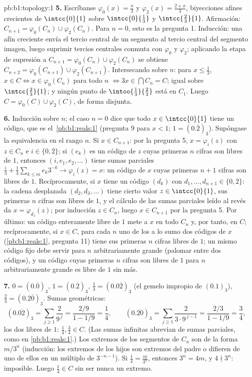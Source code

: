 \begin{solution}{pb:b1:topology:1}
\textbf{5.} Escríbanse $\varphi_0(x) = \frac x3$ y
$\varphi_2(x) = \frac{2 + x}{3}$, biyecciones afines crecientes de
$\intcc{0}{1}$ sobre $\intcc{0}{\frac13}$ y $\intcc{\frac23}{1}$.
Afirmación: $C_{n+1} = \varphi_0(C_n) \cup \varphi_2(C_n)$. Para
$n = 0$, esto es la pregunta 1. Inducción: una  afín
creciente envía el tercio central de un segmento al tercio central
del segmento imagen, luego suprimir tercios centrales conmuta con
$\varphi_0$ y $\varphi_2$; aplicando la etapa de supresión a
$C_{n+1} = \varphi_0(C_n) \cup \varphi_2(C_n)$ se obtiene
$C_{n+2} = \varphi_0(C_{n+1}) \cup \varphi_2(C_{n+1})$. Intersecando
sobre $n$: para $x \leq \frac13$, $x \in C \iff x \in \varphi_0(C_n)$
para todo $n$ $\iff 3x \in \bigcap C_n = C$; igual sobre
$\intcc{\frac23}{1}$; y ningún punto de $\intoo{\frac13}{\frac23}$
está en $C_1$. Luego $C = \varphi_0(C) \cup \varphi_2(C)$, de forma
disjunta.

\textbf{6.} Inducción sobre $n$; el caso $n = 0$ dice que todo
$x \in \intcc{0}{1}$ tiene un código, que es el~\cref{pb:b1:reals:1}
(pregunta 9 para $x < 1$; $1 = (0.\overline 2)_3$). Supóngase la
equivalencia en el rango $n$. Si $x \in C_{n+1}$: por la pregunta 5,
$x = \varphi_i(z)$ con $z \in C_n$ e $i \in \{0, 2\}$; si $(e_k)$ es
un código de $z$ cuyas primeras $n$ cifras son libres de $1$,
entonces $(i, e_1, e_2, \dots)$ tiene sumas parciales
$\frac i3 + \frac13\sum_{k\leq m} e_k 3^{-k} \to \varphi_i(z) = x$:
un código de $x$ cuyas primeras $n + 1$ cifras son libres de $1$.
Recíprocamente, si $x$ tiene un código $(d_k)$ con
$d_1, \dots, d_{n+1} \in \{0, 2\}$: la cadena desplazada
$(d_2, d_3, \dots)$ tiene cierto valor $z \in \intcc{0}{1}$, sus
primeras $n$ cifras son libres de $1$, y el cálculo de las sumas
parciales leído al revés da $x = \varphi_{d_1}(z)$; por inducción
$z \in C_n$, luego $x \in C_{n+1}$ por la pregunta 5. Por último: un
código enteramente libre de $1$ mete a $x$ en todo $C_n$ y, por
tanto, en $C$; recíprocamente, si $x \in C$, para cada $n$ uno de los
a lo sumo dos códigos de $x$ (\cref{pb:b1:reals:1}, pregunta 11)
tiene sus primeras $n$ cifras libres de $1$; un mismo código fijo
debe servir para $n$ arbitrariamente grande (palomar entre dos
códigos), y un código cuyas primeras $n$ cifras son libres de $1$
para $n$ arbitrariamente grande es libre de $1$ sin más.

\textbf{7.} $0 = (0.\overline 0)_3$, $1 = (0.\overline 2)_3$,
$\frac13 = (0.0\overline{2})_3$ (el gemelo impropio de $(0.1)_3$),
$\frac23 = (0.2\overline{0})_3$. Sumas geométricas:
\[
(0.\overline{02})_3 = \sum_{j\geq1} \frac{2}{9^{\,j}}
= \frac{2/9}{1 - 1/9} = \frac14 ,
\qquad
(0.\overline{20})_3 = \sum_{j\geq1} \frac{2}{3\cdot 9^{\,j-1}}
= \frac{2/3}{1 - 1/9} = \frac34 ,
\]
los dos libres de $1$: $\frac14, \frac34 \in C$. (Las sumas infinitas
abrevian  de sumas parciales, como en \cref{pb:b1:reals:1}.)
Los extremos de los segmentos de $C_n$ son de la forma $m/3^n$
(inducción: los extremos de los hijos son extremos del padre o
difieren de uno de ellos en un múltiplo de $3^{-n-1}$). Si
$\frac14 = \frac{m}{3^n}$, entonces $3^n = 4m$, y $4 \nmid 3^n$:
imposible. Luego $\frac14 \in C$ sin ser nunca un extremo.


\end{solution}
